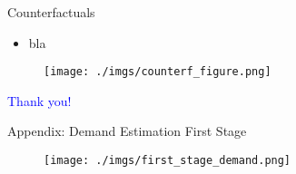 \documentclass[notes,11pt, aspectratio=169]{beamer}
\begin{document}
\begin{frame}{Counterfactuals}
    \vspace{0.5cm}
      \begin{itemize}
        \item  bla
      \end{itemize}
      
        \begin{figure}[t*]
          \centering
    
          \texttt{[image: ./imgs/counterf\_figure.png]}
        \end{figure}
        
      \end{frame}


\begin{frame}
\textcolor{blue}{\huge{\centerline{Thank you!}}}
\end{frame}

%    
%    


\appendix

\begin{frame}[label=firststage]{Appendix: Demand Estimation First Stage \hyperlink{demand}{}}
    \vspace{0.5cm}
      
        \begin{figure}[t*]
          \centering
    
          \texttt{[image: ./imgs/first\_stage\_demand.png]}
        \end{figure}
        
      \end{frame}
\end{document}
